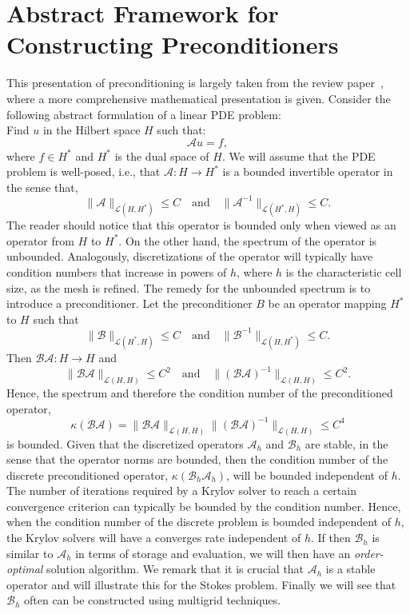 \section{Abstract Framework for Constructing Preconditioners}

This presentation of preconditioning is largely taken from the
review paper~\cite{M-W-09}, where a more comprehensive mathematical
presentation is given. Consider the following abstract formulation
of a linear PDE problem: \\ 
Find $u$ in the Hilbert space $H$ such that: 
\[
\mathcal{A} u = f,  
\]
where $f\in H^*$ and $H^*$ is the dual space of $H$.  
We will assume that the PDE problem is well-posed, i.e., 
that $\mathcal{A} : H \rightarrow H^*$ is a bounded invertible operator in the sense that,  
\[
\|\mathcal{A}\|_{\mathcal{L} (H, H^*)} \le C \quad \mbox{and} \quad  
\|\mathcal{A}^{-1}\|_{\mathcal{L} (H^*, H)} \le C. 
\]
The reader should notice that this operator is bounded only when 
viewed as an operator from $H$ to $H^*$. 
On the other hand, the spectrum of the operator is unbounded. Analogously,  
discretizations of the operator will typically have  
condition numbers that increase 
in powers of $h$, where $h$ is the
characteristic cell size, as the mesh is refined. 
The remedy for the unbounded spectrum is to introduce a preconditioner. 
Let the preconditioner $B$ be an operator
mapping $H^*$ to $H$ such that  
\[
\|\mathcal{B}\|_{\mathcal{L}(H^*, H)} \le C \quad \mbox{and} \quad   
\|\mathcal{B}^{-1}\|_{\mathcal{L}(H, H^*)} \le C. 
\]
Then 
$\mathcal{B}\mathcal{A}: H \rightarrow H$ and 
\[
\|\mathcal{B}\mathcal{A}\|_{\mathcal{L}(H, H)} \le C^2 \quad \mbox{and} \quad  
\|(\mathcal{B}\mathcal{A})^{-1}\|_{\mathcal{L}(H, H)} \le C^2. 
\]
Hence, the spectrum and therefore the condition number of the
preconditioned operator, 
\[
\kappa(\mathcal{B}\mathcal{A}) = \|\mathcal{B}\mathcal{A}\|_{\mathcal{L}(H, H)} \|(\mathcal{B}\mathcal{A})^{-1}\|_{\mathcal{L}(H, H)} \le C^4  
\]
is bounded.  
Given that the discretized operators  $\mathcal{A}_h$ and $\mathcal{B}_h$ are stable, in the sense
that the operator norms are bounded, then the condition number of the discrete preconditioned
operator, $\kappa(\mathcal{B}_h \mathcal{A}_h)$, will be bounded independent of $h$. The number of iterations required 
by a Krylov solver to reach a certain convergence criterion can typically be bounded by
the condition number. Hence, when the condition number of the discrete problem is bounded independent
of $h$, the Krylov solvers will have a converges rate independent of $h$. 
If then $\mathcal{B}_h$ is similar to $\mathcal{A}_h$ in terms of storage and evaluation, 
we will then have an \emph{order-optimal} solution algorithm. 
We remark that it is crucial that $\mathcal{A}_h$
is a stable operator and will illustrate this for the Stokes problem. 
Finally we will see that $\mathcal{B}_h$ often can be constructed 
using multigrid techniques. 

